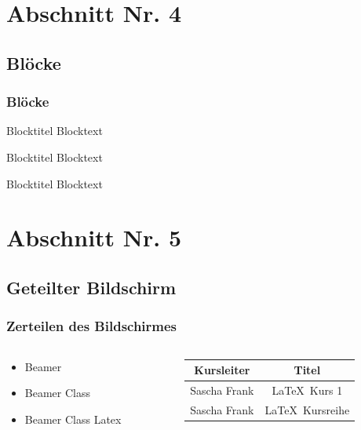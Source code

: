 \documentclass[compress,aspectratio=169]{beamer} %
\begin{document}
	
	\section{Abschnitt Nr. 4}
	\subsection{Bl\"ocke}
	\begin{frame}\frametitle{Bl\"ocke}
		
		\begin{block}{Blocktitel}
			Blocktext 
		\end{block}
		
		\begin{exampleblock}{Blocktitel}
			Blocktext 
		\end{exampleblock}
		
		
		\begin{alertblock}{Blocktitel}
			Blocktext 
		\end{alertblock}
	\end{frame}
	
	\section{Abschnitt Nr. 5}
	\subsection{Geteilter Bildschirm}
	
	\begin{frame}\frametitle{Zerteilen des Bildschirmes}
		\begin{columns}
			\begin{column}{6cm}
				\begin{itemize}
					\item Beamer 
					\item Beamer Class 
					\item Beamer Class Latex 
				\end{itemize}
			\end{column}
			\begin{column}{6cm}
				\begin{tabular}{|c|c|}
					\hline
					\textbf{Kursleiter} & \textbf{Titel} \\
					\hline
					Sascha Frank &  \LaTeX \ Kurs 1 \\
					\hline
					Sascha Frank & \LaTeX \ Kursreihe \\
					\hline
				\end{tabular}
			\end{column}
		\end{columns}
	\end{frame}
	
\end{document}
